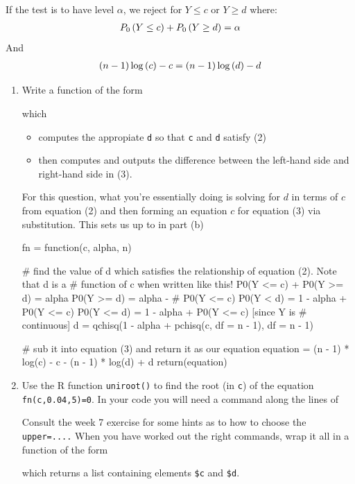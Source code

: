 \documentclass[12pt, a4paper]{article}\usepackage[]{graphicx}\usepackage[]{color}
\begin{document}
\begin{enumerate}[label = {\bfseries\arabic*.}]
If the test is to have level $\alpha$, we reject for $Y \le c$ or $Y \ge d$ where:
\begin{align}
P_0\left(Y \le c\right) + P_0\left( Y \ge d\right) = \alpha
\end{align}
And
\begin{align}
\left(n - 1\right)\log\left(c\right) - c = \left(n - 1\right)\log\left(d\right) - d
\end{align} 
  \begin{enumerate}[label = (\alph*)]
    \item Write a function of the form 
    
    which
    \begin{itemize}
    \item computes the appropiate \verb+d+ so that \verb+c+ and \verb+d+ satisfy (2)
    \item then computes and outputs the difference between the left-hand side and right-hand side in (3).
    \end{itemize}
    {\setlength{\leftskip}{3ex}
    
    For this question, what you're essentially doing is solving for $d$ in terms of $c$ from equation (2) and then forming an equation  $c$ for equation (3) via substitution. This sets us up to  in part (b)
    
\begin{Schunk}
\begin{Sinput}
fn = function(c, alpha, n) {
    # find the value of d which satisfies the relationship of equation (2). Note that d is a
    # function of c when written like this!  P0(Y <= c) + P0(Y >= d) = alpha P0(Y >= d) = alpha -
    # P0(Y <= c) P0(Y < d) = 1 - alpha + P0(Y <= c) P0(Y <= d) = 1 - alpha + P0(Y <= c) [since Y is
    # continuous]
    d = qchisq(1 - alpha + pchisq(c, df = n - 1), df = n - 1)

    # sub it into equation (3) and return it as our equation
    equation = (n - 1) * log(c) - c - (n - 1) * log(d) + d
    return(equation)
}
\end{Sinput}
\end{Schunk}

    }
  \item Use the R function \verb+uniroot()+ to find the root (in \verb+c+) of the equation \verb+fn(c,0.04,5)=0+. In your code you will need a command along the lines of
  
        Consult the week 7 exercise for some hints as to how to choose the \verb+upper=....+ When you have worked out the right commands, wrap it all in a function of the form
  
  which returns a list containing elements \verb+$c+ and \verb+$d+.
  {\setlength{\leftskip}{3ex}
  
}
\end{enumerate}
\end{enumerate}
\end{document}
